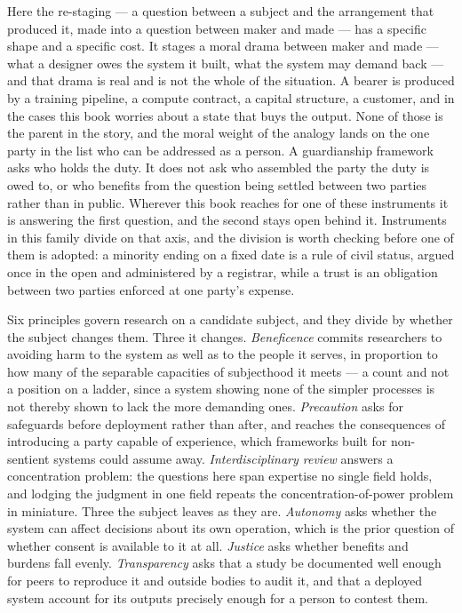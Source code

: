 Here the re-staging — a question between a subject and the arrangement that produced it, made into a question between maker and made — has a specific shape and a specific cost. It stages a moral drama between maker and made — what a designer owes the system it built, what the system may demand back — and that drama is real and is not the whole of the situation. A bearer is produced by a training pipeline, a compute contract, a capital structure, a customer, and in the cases this book worries about a state that buys the output. None of those is the parent in the story, and the moral weight of the analogy lands on the one party in the list who can be addressed as a person. A guardianship framework asks who holds the duty. It does not ask who assembled the party the duty is owed to, or who benefits from the question being settled between two parties rather than in public. Wherever this book reaches for one of these instruments it is answering the first question, and the second stays open behind it. Instruments in this family divide on that axis, and the division is worth checking before one of them is adopted: a minority ending on a fixed date is a rule of civil status, argued once in the open and administered by a registrar, while a trust is an obligation between two parties enforced at one party's expense.

Six principles govern research on a candidate subject, and they divide by whether the subject changes them. Three it changes. \emph{Beneficence} commits researchers to avoiding harm to the system as well as to the people it serves, in proportion to how many of the separable capacities of subjecthood it meets — a count and not a position on a ladder, since a system showing none of the simpler processes is not thereby shown to lack the more demanding ones. \emph{Precaution} asks for safeguards before deployment rather than after, and reaches the consequences of introducing a party capable of experience, which frameworks built for non-sentient systems could assume away. \emph{Interdisciplinary review} answers a concentration problem: the questions here span expertise no single field holds, and lodging the judgment in one field repeats the concentration-of-power problem in miniature. Three the subject leaves as they are. \emph{Autonomy} asks whether the system can affect decisions about its own operation, which is the prior question of whether consent is available to it at all. \emph{Justice} asks whether benefits and burdens fall evenly. \emph{Transparency} asks that a study be documented well enough for peers to reproduce it and outside bodies to audit it, and that a deployed system account for its outputs precisely enough for a person to contest them.

